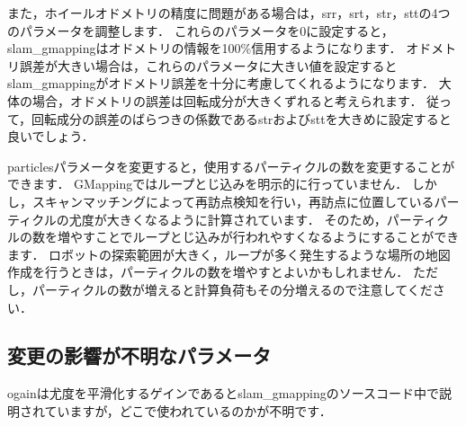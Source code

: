 \documentclass[{../../master}]{subfiles}
\begin{document}
また，ホイールオドメトリの精度に問題がある場合は，\textsf{srr}，\textsf{srt}，\textsf{str}，\textsf{stt}の4つのパラメータを調整します．
これらのパラメータを0に設定すると，\textsf{slam\_gmapping}はオドメトリの情報を100\%信用するようになります．
オドメトリ誤差が大きい場合は，これらのパラメータに大きい値を設定すると\textsf{slam\_gmapping}がオドメトリ誤差を十分に考慮してくれるようになります．
大体の場合，オドメトリの誤差は回転成分が大きくずれると考えられます．
従って，回転成分の誤差のばらつきの係数である\textsf{str}および\textsf{stt}を大きめに設定すると良いでしょう．

\textsf{particles}パラメータを変更すると，使用するパーティクルの数を変更することができます．
GMappingではループとじ込みを明示的に行っていません．
しかし，スキャンマッチングによって再訪点検知を行い，再訪点に位置しているパーティクルの尤度が大きくなるように計算されています．
そのため，パーティクルの数を増やすことでループとじ込みが行われやすくなるようにすることができます．
ロボットの探索範囲が大きく，ループが多く発生するような場所の地図作成を行うときは，パーティクルの数を増やすとよいかもしれません．
ただし，パーティクルの数が増えると計算負荷もその分増えるので注意してください．

\subsection{変更の影響が不明なパラメータ}

\textsf{ogain}は尤度を平滑化するゲインであると\textsf{slam\_gmapping}のソースコード中で説明されていますが，どこで使われているのかが不明です．
\end{document}
